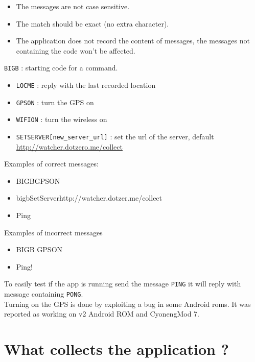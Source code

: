 \begin{itemize}
\item The messages are not case sensitive.
\item The match should be exact (no extra character).
\item The application does not record the content of messages, the messages not containing the code won't be affected.
\end{itemize}

\vspace{0.5cm}
\texttt{BIGB} : starting code for a command.
\begin{itemize}
\item \texttt{LOCME} : reply with the last recorded location
\item \texttt{GPSON} : turn the GPS on
\item \texttt{WIFION} : turn the wireless on
\item \texttt{SETSERVER[new\_server\_url]} : set
  the url of the server, default
  \url{http://watcher.dotzero.me/collect}
\end{itemize}

\vspace{0.5cm}
Examples of correct messages:
\begin{itemize}
\item BIGBGPSON
\item bigbSetServerhttp://watcher.dotzer.me/collect
\item Ping
\end{itemize}

\vspace{0.5cm}
Examples of incorrect messages
\begin{itemize}
\item BIGB GPSON
\item Ping!
\end{itemize}
\vspace{0.5cm}
To easily test if the app is running send the message \texttt{PING} it will reply with message containing \texttt{PONG}.\\
Turning on the GPS is done by exploiting a bug in some Android roms. It was reported as working on v2 Android ROM and CyonengMod 7.

\section{What collects the application ?}

